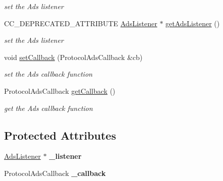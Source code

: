 \begin{DoxyCompactItemize}
\begin{DoxyCompactList}\small\item\em set the Ads listener \end{DoxyCompactList}\item 
C\+C\+\_\+\+D\+E\+P\+R\+E\+C\+A\+T\+E\+D\+\_\+\+A\+T\+T\+R\+I\+B\+U\+TE \hyperlink{classcocos2d_1_1plugin_1_1AdsListener}{Ads\+Listener} $\ast$ \hyperlink{classcocos2d_1_1plugin_1_1ProtocolAds_a283f33d33936b8fd0b8267b65e757ec0}{get\+Ads\+Listener} ()
\begin{DoxyCompactList}\small\item\em set the Ads listener \end{DoxyCompactList}\item 
\mbox{\label{classcocos2d_1_1plugin_1_1ProtocolAds_abcc82176165df867c7349cd6e741e400}} 
void \hyperlink{classcocos2d_1_1plugin_1_1ProtocolAds_abcc82176165df867c7349cd6e741e400}{set\+Callback} (Protocol\+Ads\+Callback \&cb)
\begin{DoxyCompactList}\small\item\em set the Ads callback function \end{DoxyCompactList}\item 
\mbox{\label{classcocos2d_1_1plugin_1_1ProtocolAds_a8c43ac264e7d5140d69f6fdc9e7ef0dd}} 
Protocol\+Ads\+Callback \hyperlink{classcocos2d_1_1plugin_1_1ProtocolAds_a8c43ac264e7d5140d69f6fdc9e7ef0dd}{get\+Callback} ()
\begin{DoxyCompactList}\small\item\em get the Ads callback function \end{DoxyCompactList}\end{DoxyCompactItemize}
\subsection*{Protected Attributes}
\begin{DoxyCompactItemize}
\item 
\mbox{\label{classcocos2d_1_1plugin_1_1ProtocolAds_ac72a27b14bd5666d9c6329d6b761763a}} 
\hyperlink{classcocos2d_1_1plugin_1_1AdsListener}{Ads\+Listener} $\ast$ {\bfseries \+\_\+listener}
\item 
\mbox{\label{classcocos2d_1_1plugin_1_1ProtocolAds_a90206a71b4ade7d5f05943a267686d67}} 
Protocol\+Ads\+Callback {\bfseries \+\_\+callback}
\end{DoxyCompactItemize}


